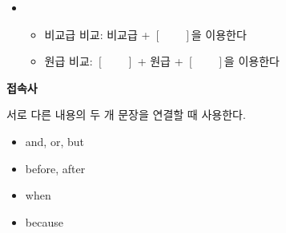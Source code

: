\documentclass[11pt, twocolumn, a4paper]{oblivoir}
\begin{document}
    \begin{itemize}[label = {}]
        \item 
        
    \begin{itemize}
        \item 비교급 비교: 비교급 + $[\qquad]$을 이용한다
        \item 원급 비교: $[\qquad]$ + 원급 + $[\qquad]$을 이용한다
    \end{itemize}
\end{itemize}
\pagebreak
    \textbf{접속사}

    서로 다른 내용의 두 개 문장을 연결할 때 사용한다. 
    \begin{itemize}
        \item and, or, but
        \item before, after 
        \item when
        \item because
    \end{itemize}
    
\end{document}
